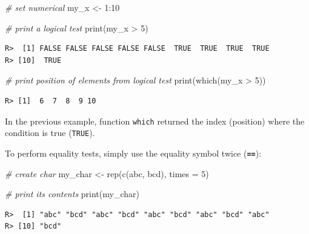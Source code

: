 \documentclass[
  12pt,
]{book}
\newenvironment{Shaded}{\begin{snugshade}}{\end{snugshade}}
\newcommand{\AttributeTok}[1]{\textcolor[rgb]{0.61,0.61,0.61}{#1}}
\newcommand{\CommentTok}[1]{\textcolor[rgb]{0.37,0.37,0.37}{\textit{#1}}}
\newcommand{\DecValTok}[1]{\textcolor[rgb]{0.06,0.06,0.06}{#1}}
\newcommand{\FunctionTok}[1]{\textcolor[rgb]{0,0,0}{#1}}
\newcommand{\NormalTok}[1]{#1}
\newcommand{\OtherTok}[1]{\textcolor[rgb]{0.37,0.37,0.37}{#1}}
\newcommand{\SpecialCharTok}[1]{\textcolor[rgb]{0,0,0}{#1}}
\newcommand{\StringTok}[1]{\textcolor[rgb]{0.5,0.5,0.5}{#1}}
\begin{document}
\begin{Shaded}
\begin{Highlighting}[]
\CommentTok{\# set numerical}
\NormalTok{my\_x }\OtherTok{\textless{}{-}} \DecValTok{1}\SpecialCharTok{:}\DecValTok{10}

\CommentTok{\# print a logical test}
\FunctionTok{print}\NormalTok{(my\_x }\SpecialCharTok{\textgreater{}} \DecValTok{5}\NormalTok{)}
\end{Highlighting}
\end{Shaded}

\begin{verbatim}
R>  [1] FALSE FALSE FALSE FALSE FALSE  TRUE  TRUE  TRUE  TRUE
R> [10]  TRUE
\end{verbatim}

\begin{Shaded}
\begin{Highlighting}[]
\CommentTok{\# print position of elements from logical test}
\FunctionTok{print}\NormalTok{(}\FunctionTok{which}\NormalTok{(my\_x }\SpecialCharTok{\textgreater{}} \DecValTok{5}\NormalTok{))}
\end{Highlighting}
\end{Shaded}

\begin{verbatim}
R> [1]  6  7  8  9 10
\end{verbatim}

In the previous example, function \texttt{which} returned the index (position) where the condition is true (\texttt{TRUE}). 

To perform equality tests, simply use the equality symbol twice (\textbf{\texttt{==}}): 

\begin{Shaded}
\begin{Highlighting}[]
\CommentTok{\# create char}
\NormalTok{my\_char }\OtherTok{\textless{}{-}} \FunctionTok{rep}\NormalTok{(}\FunctionTok{c}\NormalTok{(}\StringTok{\textquotesingle{}abc\textquotesingle{}}\NormalTok{, }\StringTok{\textquotesingle{}bcd\textquotesingle{}}\NormalTok{), }
               \AttributeTok{times =} \DecValTok{5}\NormalTok{)}

\CommentTok{\# print its contents}
\FunctionTok{print}\NormalTok{(my\_char)}
\end{Highlighting}
\end{Shaded}

\begin{verbatim}
R>  [1] "abc" "bcd" "abc" "bcd" "abc" "bcd" "abc" "bcd" "abc"
R> [10] "bcd"
\end{verbatim}
\end{document}
